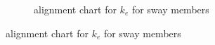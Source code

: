 \begin{figure}
\begin{subfigure}{.5\linewidth}
\caption{alignment chart for $k_e$ for sway members}
\end{subfigure}
\end{figure}
